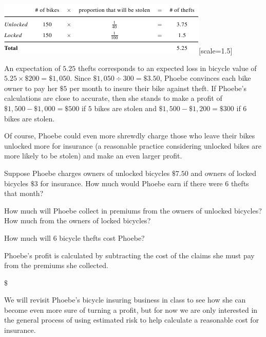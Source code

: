 \documentclass{ximera}
\begin{document}
\begin{center}
\includegraphics{InsuranceTable2.png}[scale=1.5]
\end{center}

An expectation of $5.25$ thefts corresponds to an expected loss in bicycle value of $5.25\times\$200=\$1,050$. Since $\$1,050\div 300=\$3.50$, Phoebe convinces each bike owner to pay her $\$5$ per month to insure their bike against theft. If Phoebe's calculations are close to accurate, then she stands to make a profit of $\$1,500-\$1,000=\$500$ if $5$ bikes are stolen and $\$1,500-\$1,200=\$300$ if $6$ bikes are stolen.

Of course, Phoebe could even more shrewdly charge those who leave their bikes unlocked more for insurance (a reasonable practice considering unlocked bikes are more likely to be stolen) and make an even larger profit.


\begin{question}
Suppose Phoebe charges owners of unlocked bicycles $\$7.50$ and owners of locked bicycles $\$3$ for insurance. How much would Phoebe earn if there were $6$ thefts that month?

\begin{hint}
How much will Phoebe collect in premiums from the owners of unlocked bicycles? How much from the owners of locked bicycles?
\end{hint}
\begin{hint}
How much will $6$ bicycle thefts cost Phoebe?
\end{hint}
\begin{hint}
Phoebe's profit is calculated by subtracting the cost of the claims she must pay from the premiums she collected.
\end{hint}
$\$$

\end{question}

We will revisit Phoebe's bicycle insuring business in class to see how she can become even more sure of turning a profit, but for now we are only interested in the general process of using estimated risk to help calculate a reasonable cost for insurance.
\end{document}
